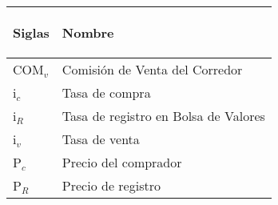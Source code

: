 \begin{spacing}{1}
	\begin{center}
		\begin{tabular}{ |p{2.5cm}|p{9.5cm}|}
			\hline
			\rowcolor{orange!50}
			\begin{center}\textbf{Siglas} \end{center} & \begin{center} \textbf{Nombre} \end{center}                                                                                                                                                                                                           \\ \hline
			
			
			COM$_{v}$                 & Comisión de Venta del Corredor                                                                                                                                                                                                      \\ \hline
			i$_{c}$                   & Tasa de compra                                                                                                                                                                                                                      \\ \hline
			i$_{R}$                   & Tasa de registro en Bolsa de Valores                                                                                                                                                                                                \\ \hline
			i$_{v}$                   & Tasa de venta                                                                                                                                                                                                                       \\ \hline
			P$_{c}$                   & Precio del comprador                                                                                                                                                                                                                \\ \hline
			P$_{R}$                   & Precio de registro                                                                                                                                                                                                                  \\ \hline

\end{tabular}
\end{center}
\end{spacing}
